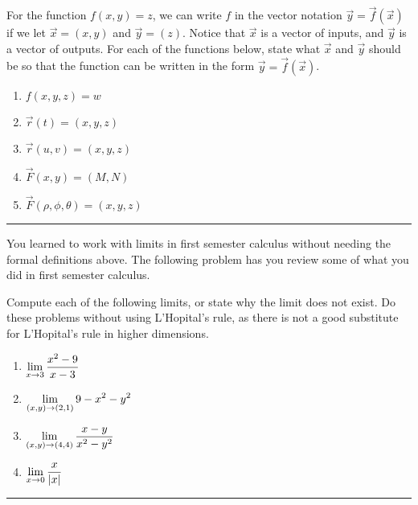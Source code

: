 \begin{problem}
 For the function $f(x,y)=z$, we can write $f$ in the vector notation $\vec y=\vec f(\vec x)$ if we let $\vec x=(x,y)$ and $\vec y=(z)$. Notice that $\vec x$ is a vector of inputs, and $\vec y$ is a vector of outputs. 
 For each of the functions below, state what $\vec x$ and $\vec y$ should be so that the function can be written in the form $\vec y = \vec f (\vec x)$.   
\begin{enumerate}
 \item $f(x,y,z)=w$
 \item $\vec r(t)=(x,y,z)$
 \item $\vec r(u,v)=(x,y,z)$
 \item $\vec F(x,y)=(M,N)$
 \item $\vec F(\rho,\phi,\theta)=(x,y,z)$
\end{enumerate}
\hrule\end{problem}


You learned to work with limits in first semester calculus without needing the formal definitions above. The following problem has you review some of what you did in first semester calculus.
\begin{problem}%
 Compute each of the following limits, or state why the limit does not exist. Do these problems without using L'Hopital's rule, as there is not a good substitute for L'Hopital's rule in higher dimensions. 
\begin{enumerate}
 \item $\displaystyle\lim_{x\to 3}\frac{x^2-9}{x-3}$
 \item $\displaystyle\lim_{(x,y)\to (2,1)} 9-x^2-y^2$
 \item $\displaystyle\lim_{(x,y)\to (4,4)} \frac{x-y}{x^2-y^2}$
 \item $\displaystyle\lim_{x\to 0}\frac{x}{|x|}$
\end{enumerate}
\hrule\end{problem}

